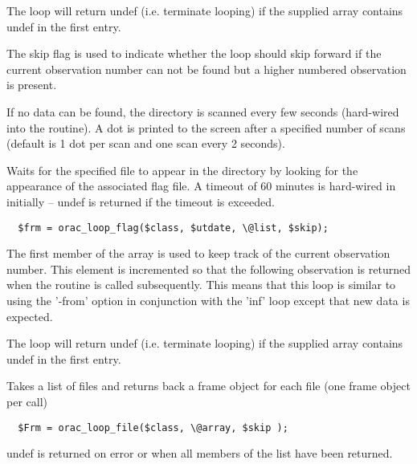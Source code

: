 \begin{description}
The loop will return undef (i.e. terminate looping) if the
supplied array contains undef in the first entry.



The skip flag is used to indicate whether the loop should skip
forward if the current observation number can not be found
but a higher numbered observation is present.



If no data can be found, the directory is scanned every few seconds
(hard-wired into the routine). A dot is printed to the screen after
a specified number of scans (default is 1 dot per scan and one scan every
2 seconds).

\item[\textbf{orac\_loop\_flag}] \mbox{}

Waits for the specified file to appear in the directory
by looking for the appearance of the associated flag file.
A timeout of 60 minutes is hard-wired in initially -- undef
is returned if the timeout is exceeded.

\begin{verbatim}
  $frm = orac_loop_flag($class, $utdate, \@list, $skip);
\end{verbatim}


The first member of the array is used to keep track of the
current observation number. This element is incremented so that
the following observation is returned when the routine is called
subsequently. This means that this loop is similar to using the
'-from' option in conjunction with the 'inf' loop except that
new data is expected.



The loop will return undef (i.e. terminate looping) if the
supplied array contains undef in the first entry.

\item[\textbf{orac\_loop\_list}] \mbox{}

Takes a list of files and returns back a frame object 
for each file (one frame object per call)

\begin{verbatim}
  $Frm = orac_loop_file($class, \@array, $skip );
\end{verbatim}


undef is returned on error or when all members of the
list have been returned.

\end{description}
